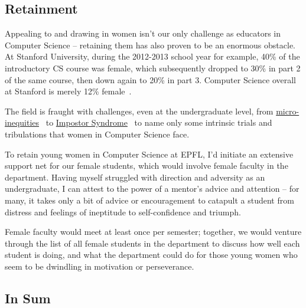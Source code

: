 \documentclass[acmtocl]{acmtrans2m}
\begin{document}

\vspace{-0.15in}
\subsection*{\textbf{Retainment}}
\vspace{-0.1in}

Appealing to and drawing in women isn't our only challenge as educators in
Computer Science -- retaining them has also proven to be an enormous obstacle.
At Stanford University, during the 2012-2013 school year for example, 40\% of
the introductory CS course was female, which subsequently dropped to 30\% in
part 2 of the same course, then down again to 20\% in part 3. Computer Science
overall at Stanford is merely 12\% female~\cite{ShePlusPlus}.

The field is fraught with challenges, even at the undergraduate level, from
\href{http://www.pgbovine.net/tech-privilege.htm}{micro-inequities}~\cite{MicroInequities} to
\href{http://www.networkworld.com/news/2012/061312-gmail-women-260169.html}{Impostor Syndrome}~\cite{ImpostorSyndrome}
to name only some intrinsic trials and tribulations that women in Computer
Science face.

To retain young women in Computer Science at EPFL, I'd initiate an extensive
support net for our female students, which would involve female faculty in the
department. Having myself struggled with direction and adversity as an
undergraduate, I can attest to the power of a mentor's advice and attention --
for many, it takes only a bit of advice or encouragement to catapult a
student from distress and feelings of ineptitude to self-confidence and
triumph.

Female faculty would meet at least once per semester; together, we would
venture through the list of all female students in the department to discuss
how well each student is doing, and what the department could do for those
young women who seem to be dwindling in motivation or perseverance.

\vspace{-0.15in}
\subsection*{\textbf{In Sum}}
\vspace{-0.1in}
\end{document}
